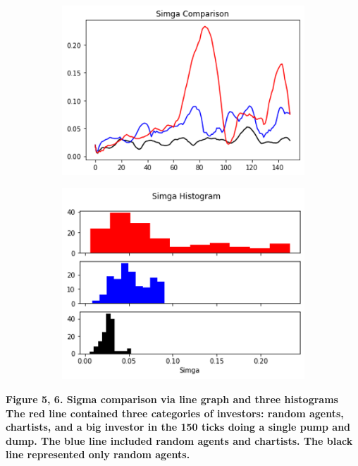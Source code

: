 \documentclass[a4paper, 12pt]{article}
\begin{document}
\begin{figure}[h!]
    \centering
    \begin{subfigure}{0.5\textwidth}
        \centering
        \includegraphics[width=\textwidth]{sigma_s3-2.png}
        \label{fig:my_label5}
    \end{subfigure}
    \hfill
    \begin{subfigure}{0.45\textwidth}
        \centering
        \includegraphics[width=\textwidth]{sigma_h.png}
        \label{fig:my_label6}
    \end{subfigure}
\end{figure} 


\textbf{Figure 5, 6. Sigma comparison via line graph and three histograms
The red line contained three categories of investors: random agents, chartists, and a big investor in the 150 ticks doing a single pump and dump. The blue line included random agents and chartists. The black line represented only random agents.}\par
\end{document}
